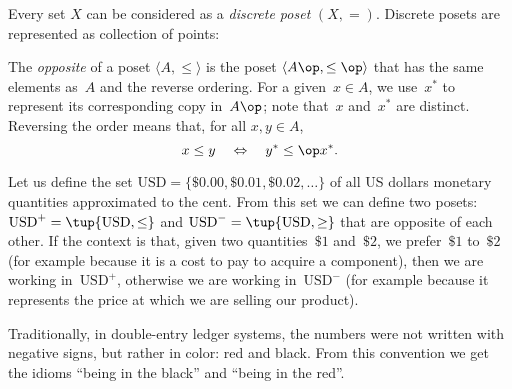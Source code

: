 \begin{example}
\label{ex:discreteposet}
{Every set $X$ can be considered as a \emph{discrete poset} $(X,=)$. Discrete posets are represented as collection of points:}
\begin{center}
\end{center}
\end{example}

\begin{definition}

    The \emph{opposite} of a  poset $\langle A, \leq \rangle $ is the poset $\langle A\op, \leq\op\rangle $ that has the same elements as~$A$ and the reverse ordering.
    For a given~$x \in A$, we use~$x^*$ to represent its corresponding copy in~$A\op$;
    note that~$x$ and~$x^*$ are distinct.
    Reversing the order means that, for all $x,y\in A$,
    \begin{equation}
        x \leq y \quad \Leftrightarrow \quad y^* \leq\op x^*.
    \end{equation}

\end{definition}

\begin{figure}[h!]
   \centering
   \caption{\label{fig:opposite}}
\end{figure}


\begin{example}
   Let us define the set $\text{USD}=\{\$0.00,\$0.01,\$0.02,\dots\}$
   of all US dollars monetary quantities approximated to the cent.
   From this set we can define two posets:
       $\text{USD}^{+} = \tup{\text{USD}, \leq}$
       and $\text{USD}^{-} = \tup{\text{USD}, \geq}$
       that are opposite of each other.
   If the context is that, given two quantities~$\$1$ and~$\$2$,
   we prefer~$\$1$ to~$\$2$ (for example because it is a cost to pay to acquire a component), then we are working in~$\text{USD}^{+}$,
   otherwise we are working in~$\text{USD}^{-}$ (for example
   because it represents the price at which we are selling our product).

   Traditionally, in double-entry ledger systems, the numbers were not
   written with negative signs, but rather in color: red and black.
   From this convention we get the idioms ``being in the black''
   and ``being in the red''.

\end{example}


